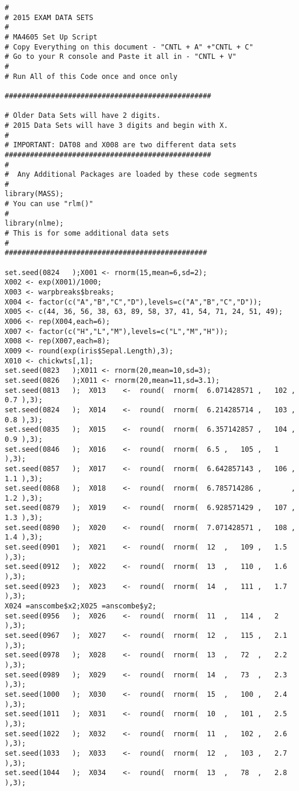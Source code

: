 \documentclass[a4paper,12pt]{article}
\begin{document}
\small
\begin{verbatim}
# 
# 2015 EXAM DATA SETS
#
# MA4605 Set Up Script
# Copy Everything on this document - "CNTL + A" +"CNTL + C"
# Go to your R console and Paste it all in - "CNTL + V"
# 
# Run All of this Code once and once only

#################################################

# Older Data Sets will have 2 digits.
# 2015 Data Sets will have 3 digits and begin with X.
# 
# IMPORTANT: DAT08 and X008 are two different data sets
#################################################
#
#  Any Additional Packages are loaded by these code segments
#  
library(MASS);
# You can use "rlm()" 
# 
library(nlme);
# This is for some additional data sets
# 
################################################

set.seed(0824	);X001 <- rnorm(15,mean=6,sd=2); 
X002 <- exp(X001)/1000;
X003 <- warpbreaks$breaks;
X004 <- factor(c("A","B","C","D"),levels=c("A","B","C","D"));
X005 <- c(44, 36, 56, 38, 63, 89, 58, 37, 41, 54, 71, 24, 51, 49);
X006 <- rep(X004,each=6);
X007 <- factor(c("H","L","M"),levels=c("L","M","H"));
X008 <- rep(X007,each=8);
X009 <- round(exp(iris$Sepal.Length),3);
X010 <- chickwts[,1];
set.seed(0823	);X011 <- rnorm(20,mean=10,sd=3); 
set.seed(0826	);X011 <- rnorm(20,mean=11,sd=3.1); 
set.seed(0813	);	X013	<-	round(	rnorm(	6.071428571	,	102	,	0.7	),3);
set.seed(0824	);	X014	<-	round(	rnorm(	6.214285714	,	103	,	0.8	),3);
set.seed(0835	);	X015	<-	round(	rnorm(	6.357142857	,	104	,	0.9	),3);
set.seed(0846	);	X016	<-	round(	rnorm(	6.5	,	105	,	1	),3);
set.seed(0857	);	X017	<-	round(	rnorm(	6.642857143	,	106	,	1.1	),3);
set.seed(0868	);	X018	<-	round(	rnorm(	6.785714286	,		,	1.2	),3);
set.seed(0879	);	X019	<-	round(	rnorm(	6.928571429	,	107	,	1.3	),3);
set.seed(0890	);	X020	<-	round(	rnorm(	7.071428571	,	108	,	1.4	),3);
set.seed(0901	);	X021	<-	round(	rnorm(	12	,	109	,	1.5	),3);
set.seed(0912	);	X022	<-	round(	rnorm(	13	,	110	,	1.6	),3);
set.seed(0923	);	X023	<-	round(	rnorm(	14	,	111	,	1.7	),3);
X024 =anscombe$x2;X025 =anscombe$y2;
set.seed(0956	);	X026	<-	round(	rnorm(	11	,	114	,	2	),3);
set.seed(0967	);	X027	<-	round(	rnorm(	12	,	115	,	2.1	),3);
set.seed(0978	);	X028	<-	round(	rnorm(	13	,	72	,	2.2	),3);
set.seed(0989	);	X029	<-	round(	rnorm(	14	,	73	,	2.3	),3);
set.seed(1000	);	X030	<-	round(	rnorm(	15	,	100	,	2.4	),3);
set.seed(1011	);	X031	<-	round(	rnorm(	10	,	101	,	2.5	),3);
set.seed(1022	);	X032	<-	round(	rnorm(	11	,	102	,	2.6	),3);
set.seed(1033	);	X033	<-	round(	rnorm(	12	,	103	,	2.7	),3);
set.seed(1044	);	X034	<-	round(	rnorm(	13	,	78	,	2.8	),3);

\end{verbatim}
\end{document}
